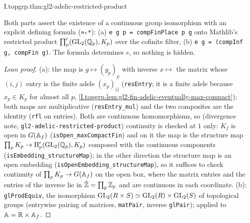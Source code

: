 \begin{theorem}
\end{theorem}
\begin{tfformal}{I.topgrp.thm:gl2-adelic-restricted-product}
\begin{tffidelity}
Both parts assert the existence of a continuous group isomorphism with an explicit defining formula (\texttt{≃ₜ*}): (a) \texttt{e g p = compFinPlace p g} onto Mathlib's restricted product $\prod'_p(\mathrm{GL}_2(\mathbb{Q}_p),K_p)$ over the cofinite filter, (b) \texttt{e g = (compInf g, compFin g)}. The formula determines $e$, so nothing is hidden.
\end{tffidelity}
\end{tfformal}
\begin{proof}[Lean proof]
(a): the map is $g\mapsto(g_p)_p$ with inverse $x\mapsto$ the matrix whose $(i,j)$ entry is the finite adele $(x_p)_{ij}$ (\texttt{resEntry}; it is a finite adele because $x_p\in K_p$ for almost all $p$, \cref{I.topgrp.lem:gl2-fin-adelic-eventually-max-compact}); both maps are multiplicative (\texttt{resEntry\_mul}) and the two composites are the identity (\texttt{rfl} on entries). Both are continuous homomorphisms, so (divergence note, \texttt{gl2-adelic-restricted-product}) continuity is checked at $1$ only: $K_f$ is open in $G(\mathbb{A}_f)$ (\texttt{isOpen\_maxCompactFin}) and on it the map is the structure map $\prod_pK_p\to\Pi'_p(\mathrm{GL}_2(\mathbb{Q}_p),K_p)$ composed with the continuous components (\texttt{isEmbedding\_structureMap}); in the other direction the structure map is an open embedding (\texttt{isOpenEmbedding\_structureMap}), so it suffices to check continuity of $\prod_pK_p\to G(\mathbb{A}_f)$ on the open box, where the matrix entries and the entries of the inverse lie in $\hat{\mathbb{Z}}=\prod_p\mathbb{Z}_p$ and are continuous in each coordinate. (b): \texttt{glProdEquiv}, the isomorphism $\mathrm{GL}_2(R\times S)\simeq\mathrm{GL}_2(R)\times\mathrm{GL}_2(S)$ of topological groups (entrywise pairing of matrices, \texttt{matPair}, inverse \texttt{glPair}); applied to $\mathbb{A}=\mathbb{R}\times\mathbb{A}_f$.
\end{proof}

